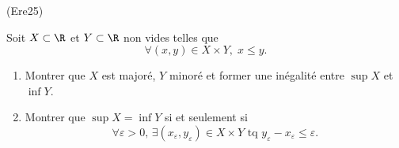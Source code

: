 \begin{tiny}(Ere25)\end{tiny} Soit $X\subset \R$ et $Y \subset \R$ non vides telles que
\begin{displaymath}
  \forall (x,y)\in X\times Y,\; x\leq y.
\end{displaymath}
\begin{enumerate} 
  \item Montrer que $X$ est majoré, $Y$ minoré et former une inégalité entre $\sup X$ et $\inf Y$.
  \item Montrer que $\sup X = \inf Y$ si et seulement si
  \[
    \forall \varepsilon >0,\, \exists(x_\varepsilon,y_\varepsilon)\in X \times Y\text{ tq }
    y_\varepsilon - x_\varepsilon \leq \varepsilon .
  \]
\end{enumerate}
